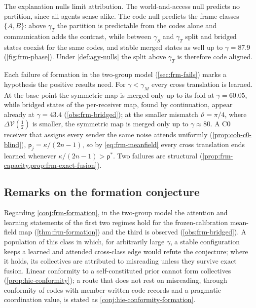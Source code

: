 The explanation nulls limit attribution. The world-and-access null predicts no partition, since all agents sense alike. The code null predicts the frame classes $\{A,B\}$: above $\gamma_T$ the partition is predictable from the codes alone and communication adds the contrast, while between $\gamma_S$ and $\gamma_T$ split and bridged states coexist for the same codes, and stable merged states as well up to $\gamma=87.9$ (\cref{fig:frm-phase}). Under \cref{def:agy-nulls} the split above $\gamma_T$ is therefore code aligned.

Each failure of formation in the two-group model (\cref{sec:frm-fails}) marks a hypothesis the positive results need. For $\gamma<\gamma_M$ every cross translation is learned. At the base point the symmetric map is merged only up to its fold at $\gamma=60.05$, while bridged states of the per-receiver map, found by continuation, appear already at $\gamma=43.4$ (\cref{obs:frm-bridged}); at the smaller mismatch $\vartheta=\pi/4$, where $\Delta\mathcal V(\frac12)$ is smaller, the symmetric map is merged only up to $\gamma\approx80$. A C0 receiver that assigns every sender the same noise attends uniformly (\cref{prop:coh-c0-blind}), $\mathsf p_j=\kappa/(2n-1)$, so by \eqref{eq:frm-meanfield} every cross translation ends learned whenever $\kappa/(2n-1)>\mathsf p^\ast$. Two failures are structural (\cref{prop:frm-capacity,prop:frm-exact-fusion}).

\subsection{Remarks on the formation conjecture}\label{sup:frm-remarks-on-the-formation-conjecture}

Regarding \cref{conj:frm-formation}, in the two-group model the attention and learning statements of the first two regimes hold for the frozen-calibration mean-field map (\cref{thm:frm-formation}) and the third is observed (\cref{obs:frm-bridged}). A population of this class in which, for arbitrarily large $\gamma$, a stable configuration keeps a learned and attended cross-class edge would refute the conjecture; where it holds, its collectives are attributed to misreading unless they survive exact fusion. Linear conformity to a self-constituted prior cannot form collectives (\cref{prop:hie-conformity}); a route that does not rest on misreading, through conformity of codes with member-written code records and a pragmatic coordination value, is stated as \cref{conj:hie-conformity-formation}.
